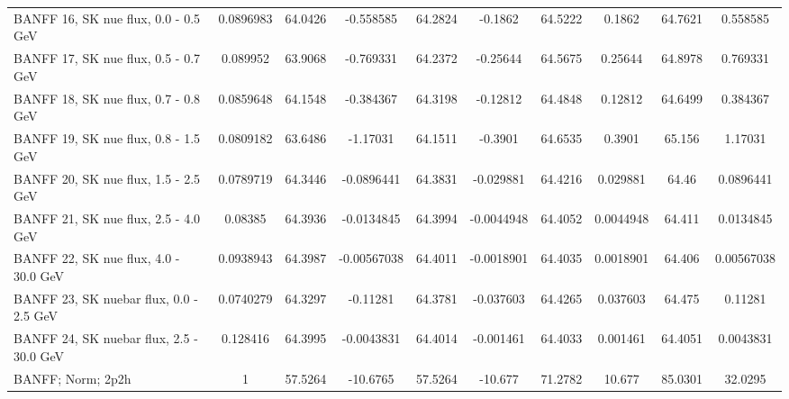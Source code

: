 \begin{tabular}{| l | S | S  S | S  S | S  S | S  S | }
                                            BANFF 16, SK nue flux, 0.0 - 0.5 GeV &       0.0896983 &         64.0426 &       -0.558585 &         64.2824 &         -0.1862 &         64.5222 &          0.1862 &         64.7621 &        0.558585 \\ 
                                            BANFF 17, SK nue flux, 0.5 - 0.7 GeV &        0.089952 &         63.9068 &       -0.769331 &         64.2372 &        -0.25644 &         64.5675 &         0.25644 &         64.8978 &        0.769331 \\ 
                                            BANFF 18, SK nue flux, 0.7 - 0.8 GeV &       0.0859648 &         64.1548 &       -0.384367 &         64.3198 &        -0.12812 &         64.4848 &         0.12812 &         64.6499 &        0.384367 \\ 
                                            BANFF 19, SK nue flux, 0.8 - 1.5 GeV &       0.0809182 &         63.6486 &        -1.17031 &         64.1511 &         -0.3901 &         64.6535 &          0.3901 &          65.156 &         1.17031 \\ 
                                            BANFF 20, SK nue flux, 1.5 - 2.5 GeV &       0.0789719 &         64.3446 &      -0.0896441 &         64.3831 &       -0.029881 &         64.4216 &        0.029881 &           64.46 &       0.0896441 \\ 
                                            BANFF 21, SK nue flux, 2.5 - 4.0 GeV &         0.08385 &         64.3936 &      -0.0134845 &         64.3994 &      -0.0044948 &         64.4052 &       0.0044948 &          64.411 &       0.0134845 \\ 
                                           BANFF 22, SK nue flux, 4.0 - 30.0 GeV &       0.0938943 &         64.3987 &     -0.00567038 &         64.4011 &      -0.0018901 &         64.4035 &       0.0018901 &          64.406 &      0.00567038 \\ 
                                         BANFF 23, SK nuebar flux, 0.0 - 2.5 GeV &       0.0740279 &         64.3297 &        -0.11281 &         64.3781 &       -0.037603 &         64.4265 &        0.037603 &          64.475 &         0.11281 \\ 
                                        BANFF 24, SK nuebar flux, 2.5 - 30.0 GeV &        0.128416 &         64.3995 &      -0.0043831 &         64.4014 &       -0.001461 &         64.4033 &        0.001461 &         64.4051 &       0.0043831 \\ 
                                                               BANFF; Norm; 2p2h &               1 &         57.5264 &        -10.6765 &         57.5264 &         -10.677 &         71.2782 &          10.677 &         85.0301 &         32.0295 \\ 

\end{tabular}
